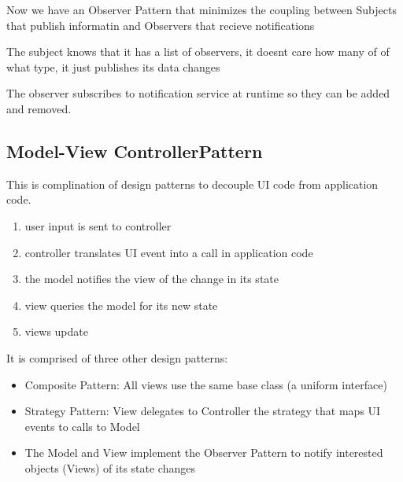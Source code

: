 \documentclass[12pt]{article}
\begin{document}
Now we have an Observer Pattern that minimizes the coupling between Subjects that publish informatin and Observers that recieve notifications

The subject knows that it has a list of observers, it doesnt care how many of of what type, it just publishes its data changes

The observer subscribes to notification service at runtime so they can be added and removed.

\subsection{Model-View ControllerPattern}
This is complination of design patterns to decouple UI code from application code.

\begin{enumerate}
    \item user input is sent to controller
    \item controller translates UI event into a call in application code
    \item the model notifies the view of the change in its state
    \item view queries the model for its new state
    \item views update
\end{enumerate}

It is comprised of three other design patterns:
\begin{itemize}
    \item Composite Pattern: All views use the same base class (a uniform interface)
    \item Strategy Pattern: View delegates to Controller the strategy that maps UI events to calls to Model
    \item The Model and View implement the Observer Pattern to notify interested objects (Views) of its state changes
\end{itemize}
\end{document}
